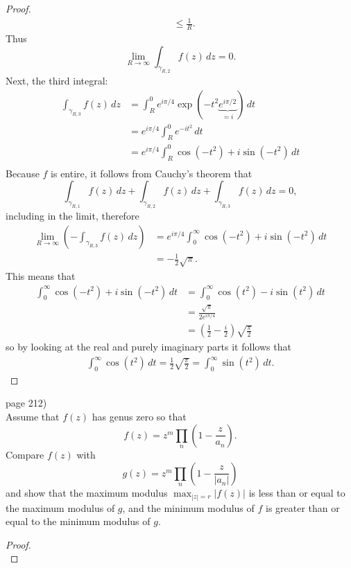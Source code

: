 \documentclass{article}
\newenvironment{problem}[2][Problem]{\begin{trivlist}
\item[\hskip \labelsep {\bfseries #1}\hskip \labelsep {\bfseries #2.}]}{\end{trivlist}}
\begin{document}
\begin{proof}
\begin{align}
    &\leq \frac{1}{R}.
  \end{align}
  Thus \[
    \lim_{R \rightarrow \infty}\int_{\gamma_{R,2}} f(z)\,dz = 0.
  \]
  Next, the third integral: \begin{align*}
    \int_{\gamma_{R,3}} f(z)\,dz
      &= \int_R^0 e^{i\pi/4}\exp(-t^2\underbrace{e^{i\pi/2}}_{=i})\,dt \\
      &= e^{i\pi/4}\int_R^0 e^{-it^2}\,dt \\
      &= e^{i\pi/4}\int_R^0 \cos(-t^2) + i \sin(-t^2)\,dt \\
  \end{align*}
  Because $f$ is entire, it follows from Cauchy's theorem that \[
    \int_{\gamma_{R,1}} f(z)\,dz + \int_{\gamma_{R,2}} f(z)\,dz + \int_{\gamma_{R,3}} f(z)\,dz = 0,
  \] including in the limit, therefore \begin{align*}
    \lim_{R\rightarrow \infty}\left(-\int_{\gamma_{R,3}} f(z)\,dz\right)
      &= e^{i\pi/4}\int_0^\infty \cos(-t^2) + i \sin(-t^2)\,dt \\
      &= -\frac{1}{2}\sqrt{\pi}.
  \end{align*} This means that \begin{align}
    \int_0^\infty \cos(-t^2) + i \sin(-t^2)\,dt
    &= \int_0^\infty \cos(t^2) - i \sin(t^2)\,dt \\
    &= \frac{\sqrt{\pi}}{2e^{i\pi/4}} \\
    &= \left(\frac{1}{2} - \frac{i}{2}\right)\sqrt{\frac{\pi}{2}}
  \end{align}
    so by looking at the real and purely imaginary parts it follows that
    \begin{align}
    \int_0^\infty \cos(t^2)\,dt
      = \frac{1}{2}\sqrt{\frac{\pi}{2}}
      = \int_0^\infty \sin(t^2)\,dt.
  \end{align}
\end{proof}
\pagebreak

\begin{problem}{2} (page 212) \\
  Assume that $f(z)$ has genus zero so that \[
    f(z) = z^m \prod_n \left(1-\frac{z}{a_n}\right).
  \] Compare $f(z)$ with \[
    g(z) = z^m \prod_n \left(1 - \frac{z}{|a_n|}\right)
  \] and show that the maximum modulus $\displaystyle\max_{|z|=r} |f(z)|$ is
  less than or equal to the maximum modulus of $g$, and the minimum modulus of
  $f$ is greater than or equal to the minimum modulus of $g$.
\end{problem}
\begin{proof} \text{} \\
\end{proof}
\end{document}
